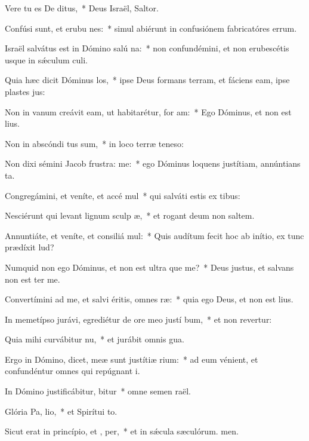 \item Vere tu es De ditus,~* Deus Israël, Saltor.
\item Confúsi sunt, et erubu nes:~* simul abiérunt in confusiónem fabricatóres errum.
\item Israël salvátus est in Dómino salú na:~* non confundémini, et non erubescétis usque in sǽculum culi.
\item Quia hæc dicit Dóminus  los,~* ipse Deus formans terram, et fáciens eam, ipse plastes jus:
\item Non in vanum creávit eam, ut habitarétur, for am:~* Ego Dóminus, et non est lius.
\item Non in abscóndi tus sum,~* in loco terræ teneso:
\item Non dixi sémini Jacob frustra:  me:~* ego Dóminus loquens justítiam, annúntians ta.
\item Congregámini, et veníte, et accé mul~* qui salváti estis ex tibus:
\item Nesciérunt qui levant lignum sculp æ,~* et rogant deum non saltem.
\item Annuntiáte, et veníte, et consiliá mul:~* Quis audítum fecit hoc ab inítio, ex tunc prædíxit lud?
\item Numquid non ego Dóminus, et non est ultra  que me?~* Deus justus, et salvans non est ter me.
\item Convertímini ad me, et salvi éritis, omnes  ræ:~* quia ego Deus, et non est lius.
\item In memetípso jurávi, egrediétur de ore meo justí bum,~* et non revertur:
\item Quia mihi curvábitur  nu,~* et jurábit omnis gua.
\item Ergo in Dómino, dicet, meæ sunt justítiæ  rium:~* ad eum vénient, et confundéntur omnes qui repúgnant i.
\item In Dómino justificábitur,  bitur~* omne semen raël.
\item Glória Pa,  lio,~* et Spirítui to.
\item Sicut erat in princípio, et ,  per,~* et in sǽcula sæculórum. men.
